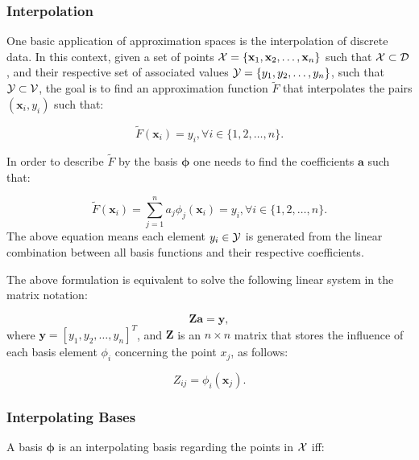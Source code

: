\subsubsection{Interpolation}
\label{sss.interpolation}

One basic application of approximation spaces is the interpolation of discrete data. In this context, given a set of points ${\cal X}=\{\textbf{x}_1,\textbf{x}_2,\ldots,\textbf{x}_n\}$ such that ${\cal X}\subset{\cal D}$, and their respective set of associated values ${\cal Y}=\{y_1,y_2,\ldots,y_n\}$, such that ${\cal Y}\subset {\cal V}$, the goal is to find an approximation function $\tilde{F}$ that interpolates the pairs $(\textbf{x}_i,y_i)$ such that:

\begin{equation}
	\tilde{F}(\textbf{x}_i) = y_i,\forall i\in\{1,2,\ldots,n\}.
\end{equation}

In order to describe $\tilde{F}$ by the basis $\mathbf{\phi}$ one needs to find the coefficients $\mathbf{a}$ such that:

\begin{equation}
	\tilde{F}(\textbf{x}_i)=\sum_{j=1}^na_j\phi_j(\textbf{x}_i)=y_i,\forall i\in\{1,2,\ldots,n\}.
\end{equation}
The above equation means each element $y_i\in{\cal Y}$ is generated from the linear combination between all basis functions and their respective coefficients.

The above formulation is equivalent to solve the following linear system in the matrix notation:

\begin{equation}
	\mathbf{Z}\mathbf{a}=\mathbf{y},
\end{equation}
where $\mathbf{y}=[y_1,y_2,\ldots,y_n]^T$, and $\mathbf{Z}$ is an $n\times n$ matrix that stores the influence of each basis element $\phi_i$ concerning the point $x_j$, as follows:

\begin{equation}
	Z_{ij}=\phi_i(\textbf{x}_j).
\end{equation}

\subsubsection{Interpolating Bases}
\label{sss.interpolating_bases}

A basis $\mathbf{\phi}$ is an interpolating basis regarding the points in ${\cal X}$ iff:

